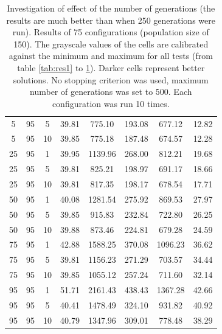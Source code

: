 \begin{table}[H]
\begin{tabular}{ccc|c|c|c|c|c}
5 & 95 & 5 & \cellcolor{gray!80}39.81 & \cellcolor{gray!72}775.10 & \cellcolor{gray!65}193.08 & \cellcolor{gray!75}677.12 & 12.82\\
5 & 95 & 10 & \cellcolor{gray!80}39.85 & \cellcolor{gray!72}775.18 & \cellcolor{gray!70}187.48 & \cellcolor{gray!76}674.57 & 12.28\\
25 & 95 & 1 & \cellcolor{gray!79}39.95 & \cellcolor{gray!11}1139.96 & \cellcolor{gray!1}268.00 & \cellcolor{gray!34}812.21 & 19.68\\
25 & 95 & 5 & \cellcolor{gray!80}39.81 & \cellcolor{gray!64}825.21 & \cellcolor{gray!60}198.97 & \cellcolor{gray!71}691.17 & 18.66\\
25 & 95 & 10 & \cellcolor{gray!80}39.81 & \cellcolor{gray!65}817.35 & \cellcolor{gray!60}198.17 & \cellcolor{gray!75}678.54 & 17.71\\
50 & 95 & 1 & \cellcolor{gray!78}40.08 & \cellcolor{gray!1}1281.54 & \cellcolor{gray!1}275.92 & \cellcolor{gray!16}869.53 & 27.97\\
50 & 95 & 5 & \cellcolor{gray!80}39.85 & \cellcolor{gray!49}915.83 & \cellcolor{gray!28}232.84 & \cellcolor{gray!61}722.80 & 26.25\\
50 & 95 & 10 & \cellcolor{gray!80}39.88 & \cellcolor{gray!56}873.46 & \cellcolor{gray!36}224.81 & \cellcolor{gray!75}679.28 & 24.59\\
75 & 95 & 1 & \cellcolor{gray!49}42.88 & \cellcolor{gray!1}1588.25 & \cellcolor{gray!1}370.08 & \cellcolor{gray!1}1096.23 & 36.62\\
75 & 95 & 5 & \cellcolor{gray!80}39.81 & \cellcolor{gray!9}1156.23 & \cellcolor{gray!1}271.29 & \cellcolor{gray!67}703.57 & 34.44\\
75 & 95 & 10 & \cellcolor{gray!80}39.85 & \cellcolor{gray!26}1055.12 & \cellcolor{gray!5}257.24 & \cellcolor{gray!65}711.60 & 32.14\\
95 & 95 & 1 & \cellcolor{gray!1}51.71 & \cellcolor{gray!1}2161.43 & \cellcolor{gray!1}438.43 & \cellcolor{gray!1}1367.28 & 42.66\\
95 & 95 & 5 & \cellcolor{gray!74}40.41 & \cellcolor{gray!1}1478.49 & \cellcolor{gray!1}324.10 & \cellcolor{gray!1}931.82 & 40.92\\
95 & 95 & 10 & \cellcolor{gray!71}40.79 & \cellcolor{gray!1}1347.96 & \cellcolor{gray!1}309.01 & \cellcolor{gray!44}778.48 & 38.29
\end{tabular}
\caption{Investigation of effect of the number of generations (the results are much better than when 250 generations were run). Results of 75 configurations (population size of 150). The grayscale values of the cells are calibrated against the minimum and maximum for all tests (from table \ref{tab:res1} to \ref{tab:res5}). Darker cells represent better solutions. No stopping criterion was used, maximum number of generations was set to 500. Each configuration was run 10 times.}
\label{tab:res5}
\end{table}

